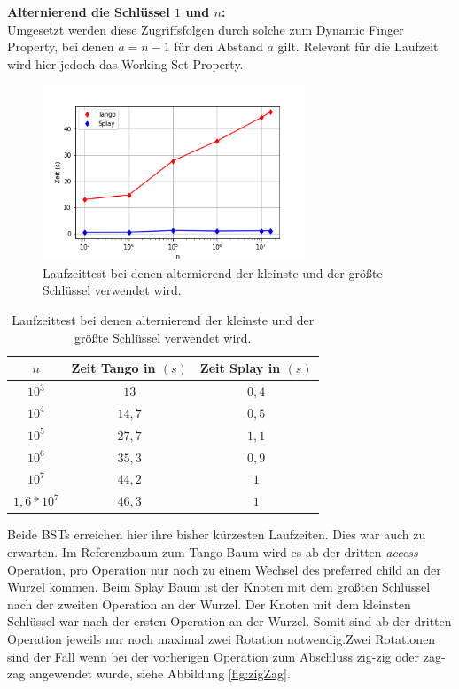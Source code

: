 \documentclass[a4paper,12pt]{article}
\begin{document}
\noindent \textbf{Alternierend die Schlüssel $1$ und $n$:\\}
 \bigskip
\noindent Umgesetzt werden diese Zugriffsfolgen durch solche zum Dynamic Finger Property, bei denen $a = n -1$ für den Abstand $a$ gilt. Relevant für die Laufzeit wird hier jedoch das Working Set Property.

\begin{figure}[H]
	\centering
	\includegraphics[width=0.7\textwidth]{Medien/laufzeittest/diagramm/kleinGros}
	\caption{Laufzeittest bei denen alternierend der kleinste und der größte Schlüssel verwendet wird.}
\end{figure}
\begin{table}[H]
	\begin{center}
		\begin{tabular}[c]{|c|c|c|}
			\hline
			$n$ & Zeit Tango in $\left(s\right)$ &Zeit Splay in $\left(s\right)$ \\
			\hline
			$10^3$ & $13$ &$0,4$ \\
			\hline
			$10^4$  & $14,7$ &$0,5$  \\
			\hline
			$10^5$  & $27,7$ &$1,1$  \\
			\hline
			$10^6$  & $35,3$ &$0,9$  \\
			\hline
			$10^7$  & $44,2$ &$1$  \\
			\hline
			$1,6 *10^7$  & $46,3$ &$1$  \\
			\hline
		\end{tabular}
		\caption{Laufzeittest bei denen alternierend der kleinste und der größte Schlüssel verwendet wird.} 
	\end{center}
\end{table}
\noindent Beide BSTs erreichen hier ihre bisher kürzesten Laufzeiten. Dies war auch zu erwarten. Im Referenzbaum zum Tango Baum wird es ab der dritten \textit{access} Operation, pro Operation nur noch zu einem Wechsel des preferred child an der Wurzel kommen. Beim Splay Baum ist der Knoten mit dem größten Schlüssel nach der zweiten Operation an der Wurzel. Der Knoten mit dem kleinsten Schlüssel war nach der ersten Operation an der Wurzel. Somit sind ab der dritten Operation jeweils nur noch maximal zwei Rotation notwendig.Zwei Rotationen sind der Fall wenn bei der vorherigen Operation zum Abschluss zig-zig oder zag-zag angewendet wurde, siehe Abbildung \ref{fig:zigZag}.
 
\end{document}
